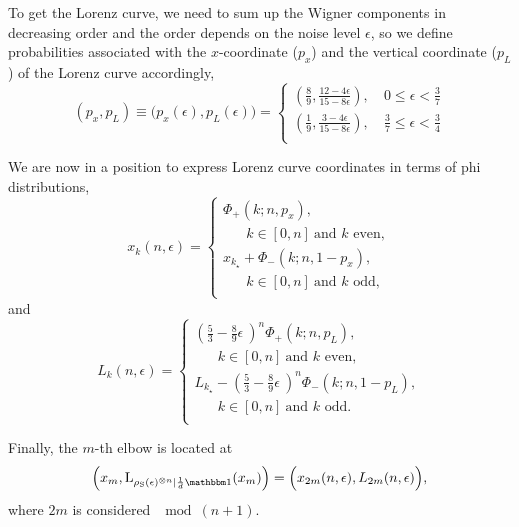 To get the Lorenz curve, we need to sum up the Wigner components in decreasing order and the order depends on the noise level $\epsilon$, so we define probabilities associated with the $x$-coordinate ($p_x$) and the vertical coordinate ($p_L$) of the Lorenz curve accordingly,
\begin{equation}
	(p_x, p_L) \equiv \big( p_x(\epsilon), p_L(\epsilon) \big) = 
	\begin{cases}
		\left( \frac{8}{9}, \frac{12-4\epsilon}{15-8\epsilon} \right),\ & 0\leq \epsilon < \frac{3}{7} \\
		\left( \frac{1}{9}, \frac{3-4\epsilon}{15-8\epsilon} \right),\ & \frac{3}{7}\leq \epsilon < \frac{3}{4} \\
	\end{cases}	
\end{equation}

We are now in a position to express Lorenz curve coordinates in terms of phi distributions,
\begin{equation}\label{eq:x_coord_elb}
	x_k(n, \epsilon) = 
	\begin{cases}
		\Phi_+(k;n,p_x),\\
		\hspace{20pt} k\in[0,n]\ \text{and }k\text{ even}, \\
		x_{k_\star} + \Phi_-(k;n,1-p_x),\\
		\hspace{20pt} k\in[0,n]\ \text{and }k\text{ odd}, \\
	\end{cases}	
\end{equation}
and
\begin{equation}\label{eq:lc_coord_elb}
	L_k(n, \epsilon) = 
	\begin{cases}
		\left( \frac{5}{3} - \frac{8}{9}\epsilon\ \right)^n \Phi_+(k;n,p_L),\\
		\hspace{20pt} k\in[0,n]\ \text{and }k\text{ even}, \\
		L_{k_\star} - \left( \frac{5}{3} - \frac{8}{9}\epsilon\ \right)^n\Phi_-(k;n,1-p_L),\\
		\hspace{20pt} k\in[0,n]\ \text{and }k\text{ odd}. \\
	\end{cases}	
\end{equation}

Finally, the $m$-th elbow is located at
\begin{equation}\label{eq:lcsu_elbows}
	\left(x_m, \lc{\noisysn}{\frac{1}{d}\id}(x_m) \right) = \Big( x_{2m}(n, \epsilon), L_{2m}(n, \epsilon) \Big),
\end{equation}
where $2m$ is considered \hspace{-7pt}$\mod{(n+1)}$.

